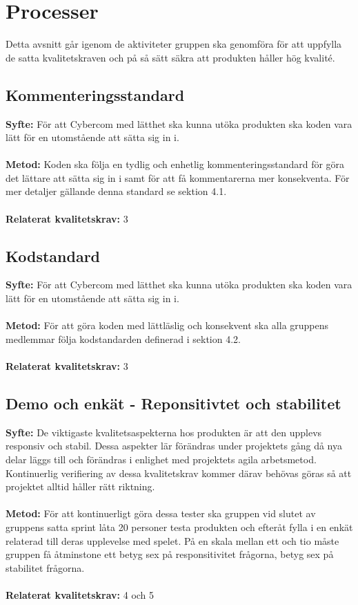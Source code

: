\documentclass[10pt]{article}
\begin{document}
\pagebreak
\section{Processer}
	Detta avsnitt går igenom de aktiviteter gruppen ska genomföra för att uppfylla de satta kvalitetskraven och på så sätt säkra att produkten håller hög kvalité.
	\subsection{Kommenteringsstandard}
	\textbf{Syfte:} För att Cybercom med lätthet ska kunna utöka produkten ska koden vara lätt för en utomstående att sätta sig in i.
	\\\\
	\textbf{Metod:} Koden ska följa en tydlig och enhetlig kommenteringsstandard för göra det lättare att sätta sig in i samt för att få kommentarerna mer konsekventa. För mer detaljer gällande denna standard se sektion 4.1.
	\\\\
	\textbf{Relaterat kvalitetskrav:} 3
	\\
	
	\subsection{Kodstandard}
	\textbf{Syfte:} För att Cybercom med lätthet ska kunna utöka produkten ska koden vara lätt för en utomstående att sätta sig in i.
	\\\\
	\textbf{Metod:} För att göra koden med lättläslig och konsekvent ska alla gruppens medlemmar följa kodstandarden definerad i sektion 4.2.
	\\\\
	\textbf{Relaterat kvalitetskrav:} 3
	\\
	
	\subsection{Demo och enkät - Reponsitivtet och stabilitet}
	\textbf{Syfte:} De viktigaste kvalitetsaspekterna hos produkten är att den upplevs responsiv och stabil. Dessa aspekter lär förändras under projektets gång då nya delar läggs till och förändras i enlighet med projektets agila arbetsmetod. Kontinuerlig verifiering av dessa kvalitetskrav kommer därav behövas göras så att projektet alltid håller rätt riktning.
	\\\\
	\textbf{Metod:} För att kontinuerligt göra dessa tester ska gruppen vid slutet av gruppens satta sprint låta 20 personer testa produkten och efteråt fylla i en enkät relaterad till deras upplevelse med spelet. På en skala mellan ett och tio måste gruppen få åtminstone ett betyg sex på responsitivitet frågorna, betyg sex på stabilitet frågorna.
	\\\\
	\textbf{Relaterat kvalitetskrav:} 4 och 5
	\\
	
\end{document}
